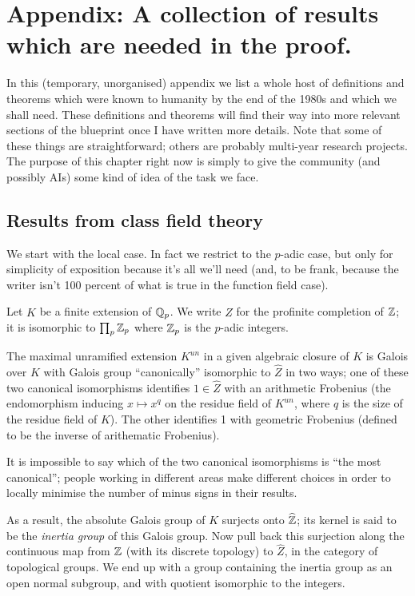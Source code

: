 \chapter{Appendix: A collection of results which are needed in the proof.}

In this (temporary, unorganised) appendix we list a whole host of definitions and theorems  which were known to humanity by the end of the 1980s and which we shall need. These definitions and theorems will find their way into more relevant sections of the blueprint once I have written more details. Note that some of these things are straightforward; others are probably multi-year research projects. The purpose of this chapter right now is simply to give the community (and possibly AIs) some kind of idea of the task we face.

\section{Results from class field theory}

We start with the local case. In fact we restrict to the $p$-adic case, but only for simplicity of exposition because it's all we'll need (and, to be frank, because the writer isn't 100 percent of what is true in the function field case).

Let $K$ be a finite extension of $\mathbb{Q}_p$. We write $\widehat{Z}$ for the profinite completion of $\mathbb{Z}$; it is isomorphic to $\prod_p\mathbb{Z}_p$ where $\mathbb{Z}_p$ is the $p$-adic integers.

\begin{theorem}\label{maximal_unramified_extension_of_p-adic_field} The maximal unramified extension $K^{un}$ in a given algebraic closure of $K$
    is Galois over $K$ with Galois group ``canonically'' isomorphic to $\widehat{Z}$ in two ways; one of these two canonical isomorphisms identifies $1\in\widehat{Z}$ with an arithmetic Frobenius (the endomorphism inducing $x\mapsto x^q$ on the residue field of $K^{un}$, where $q$ is the size of the residue field of $K$). The other identifies 1 with geometric Frobenius (defined to be the inverse of arithematic Frobenius).
\end{theorem}

It is impossible to say which of the two canonical isomorphisms is ``the most canonical''; people working in different areas make different choices in order to locally minimise the number of minus signs in their results.

As a result, the absolute Galois group of $K$ surjects onto $\widehat{\mathbb{Z}}$; its kernel is said to be the \emph{inertia group} of this Galois group. Now pull back this surjection along the continuous map from $\mathbb{Z}$ (with its discrete topology) to $\widehat{Z}$, in the category of topological groups. We end up with a group containing the inertia group as an open normal subgroup, and with quotient isomorphic to the integers.

